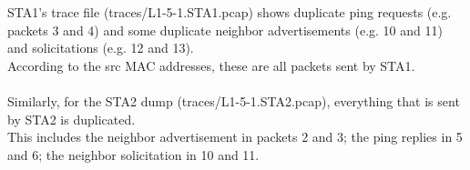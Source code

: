 STA1's trace file (traces/L1-5-1.STA1.pcap) shows duplicate ping requests (e.g. packets 3 and 4) and some duplicate neighbor advertisements (e.g. 10 and 11) and solicitations (e.g. 12 and 13).\\
According to the src MAC addresses, these are all packets sent by STA1.\\ \\
Similarly, for the STA2 dump (traces/L1-5-1.STA2.pcap), everything that is sent by STA2 is duplicated. \\
This includes the neighbor advertisement in packets 2 and 3; the ping replies in 5 and 6; the neighbor solicitation in 10 and 11.
